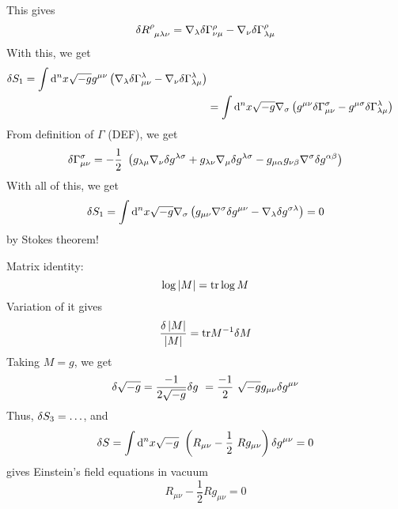 This gives
\begin{equation}
	\variation{R\indices{^\rho_\mu_\lambda_\nu}} = \nabla_\lambda \variation{\Gamma^\rho_{\nu \mu}}
	                                             - \nabla_\nu \variation{\Gamma^\rho_{\lambda \mu}}
\end{equation}
With this, we get
\begin{equation}
\begin{split}
	\delta S_1  = \int \mathop{}\!\mathrm{d}^n x \sqrt{-g} g^{\mu \nu} \left( \nabla_\lambda \delta \Gamma^\lambda_{\mu \nu} - \nabla_\nu \delta \Gamma^\lambda_{\lambda \mu} \right) \\
	                &= \int \mathop{}\!\mathrm{d}^n x \sqrt{-g} \nabla_\sigma \left( g^{\mu \nu} \delta \Gamma^\sigma_{\mu \nu} - g^{\mu \sigma} \delta \Gamma^\lambda_{\lambda \mu} \right) \\
\end{split}
\end{equation}
From definition of $\Gamma$ (DEF), we get
\begin{equation}
	\variation{\Gamma^\sigma_{\mu \nu}} = -\frac{1}{2} \left( 
		g_{\lambda \mu} \nabla_\nu \variation{g^{\lambda \sigma}} +
		g_{\lambda \nu} \nabla_\mu \variation{g^{\lambda \sigma}} -
		g_{\mu \alpha} g_{\nu \beta} \nabla^\sigma \variation{g^{\alpha \beta}}
	\right)
\end{equation}
With all of this, we get
\begin{equation}
	\delta S_1 = \int \mathop{}\!\mathrm{d}^n x \sqrt{-g} \nabla_\sigma \left( g_{\mu \nu} \nabla^\sigma \delta g^{\mu \nu} - \nabla_\lambda \delta g^{\sigma \lambda} \right) = 0
\end{equation}
by Stokes theorem!

Matrix identity:
\begin{equation}
	\log{\left\lvert M \right\rvert} = \text{tr} \log{M}
\end{equation}
Variation of it gives
\begin{equation}
	\frac{\delta \left\lvert M \right\rvert}{\left\lvert M \right\rvert} = \text{tr} M^{-1} \delta M
\end{equation}
Taking $M = g$, we get
\begin{equation}
	\variation{\sqrt{-g}} = \frac{-1}{2 \sqrt{-g}} \variation{g} = \frac{-1}{2} \sqrt{-g} g_{\mu \nu} \variation{g^{\mu \nu}}
\end{equation}
Thus, $\delta S_3 = \ldots$, and
\begin{equation}
	\variation{S} = \int \dif^n x \sqrt{-g} \left( R_{\mu \nu} - \frac{1}{2} R g_{\mu \nu} \right) \variation{g^{\mu \nu}} = 0
\end{equation}
gives Einstein's field equations in vacuum
\begin{equation}
	 R_{\mu \nu} - \frac{1}{2} R g_{\mu \nu} = 0
\end{equation}

